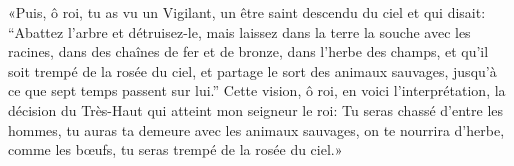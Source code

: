 «Puis, ô roi, tu as vu un Vigilant,
	un être saint descendu du ciel et qui disait:
	“Abattez l’arbre et détruisez-le,
	mais laissez dans la terre la souche avec les racines,
	dans des chaînes de fer et de bronze, dans l’herbe des champs,
	et qu’il soit trempé de la rosée du ciel, et partage le sort des animaux sauvages,
	jusqu’à ce que sept temps passent sur lui.”
Cette vision, ô roi, en voici l’interprétation,
	la décision du Très-Haut qui atteint mon seigneur le roi:
Tu seras chassé d’entre les hommes, tu auras ta demeure avec les animaux sauvages,
	on te nourrira d’herbe, comme les bœufs, tu seras trempé de la rosée du ciel.»
